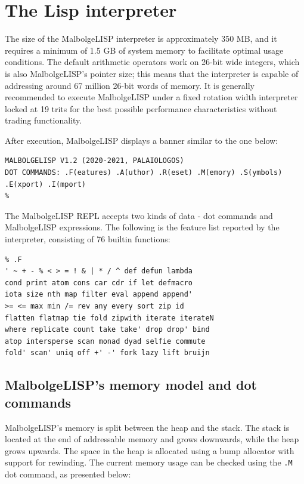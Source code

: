 
\chapter{The Lisp interpreter}

\par The size of the MalbolgeLISP interpreter is approximately 350 MB, and it requires a minimum of 1.5 GB of system memory to facilitate optimal usage conditions. The default arithmetic operators work on 26-bit wide integers, which is also MalbolgeLISP's pointer size; this means that the interpreter is capable of addressing around 67 million 26-bit words of memory. It is generally recommended to execute MalbolgeLISP under a fixed rotation width interpreter locked at 19 trits for the best possible performance characteristics without trading functionality.

\par After execution, MalbolgeLISP displays a banner similar to the one below:

\begin{verbatim}
MALBOLGELISP V1.2 (2020-2021, PALAIOLOGOS)
DOT COMMANDS: .F(eatures) .A(uthor) .R(eset) .M(emory) .S(ymbols) .E(xport) .I(mport)
% 
\end{verbatim}

\par The MalbolgeLISP REPL accepts two kinds of data - dot commands and MalbolgeLISP expressions. The following is the feature list reported by the interpreter, consisting of 76 builtin functions:

\begin{verbatim}
% .F
' ~ + - % < > = ! & | * / ^ def defun lambda
cond print atom cons car cdr if let defmacro
iota size nth map filter eval append append'
>= <= max min /= rev any every sort zip id
flatten flatmap tie fold zipwith iterate iterateN
where replicate count take take' drop drop' bind
atop intersperse scan monad dyad selfie commute
fold' scan' uniq off +' -' fork lazy lift bruijn
\end{verbatim}

\section{MalbolgeLISP's memory model and dot commands}

\par MalbolgeLISP's memory is split between the heap and the stack. The stack is located at the end of addressable memory and grows downwards, while the heap grows upwards. The space in the heap is allocated using a bump allocator with support for rewinding. The current memory usage can be checked using the \verb|.M| dot command, as presented below:

